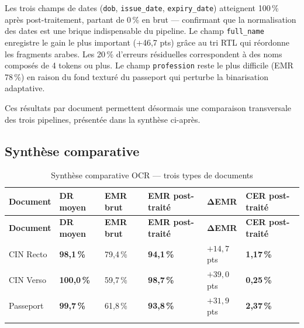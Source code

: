 \noindent Les trois champs de dates (\texttt{dob}, \texttt{issue\_date}, \texttt{expiry\_date}) atteignent 100\,\% après post-traitement, partant de 0\,\% en brut --- confirmant que la normalisation des dates est une brique indispensable du pipeline. Le champ \texttt{full\_name} enregistre le gain le plus important (+46,7 pts) grâce au tri RTL qui réordonne les fragments arabes. Les 20\,\% d'erreurs résiduelles correspondent à des noms composés de 4 tokens ou plus. Le champ \texttt{profession} reste le plus difficile (EMR 78\,\%) en raison du fond texturé du passeport qui perturbe la binarisation adaptative.

\medskip

Ces résultats par document permettent désormais une comparaison transversale des trois pipelines, présentée dans la synthèse ci-après.

\subsection{Synthèse comparative}
\label{subsec:synthese-ocr}

\renewcommand{\arraystretch}{1.35}
\begin{longtable}{|p{2.5cm}|p{2cm}|p{2cm}|p{2.8cm}|p{2cm}|p{2.8cm}|}
  \hline
  \rowcolor{bleu_principal!15}
  \textbf{Document} & \textbf{DR moyen} & \textbf{EMR brut} & \textbf{EMR post-traité} & $\boldsymbol{\Delta}$\textbf{EMR} & \textbf{CER post-traité} \\
  \hline
  \endfirsthead
  \hline
  \rowcolor{bleu_principal!15}
  \textbf{Document} & \textbf{DR moyen} & \textbf{EMR brut} & \textbf{EMR post-traité} & $\boldsymbol{\Delta}$\textbf{EMR} & \textbf{CER post-traité} \\
  \hline
  \endhead
  CIN Recto  & \textbf{98,1\,\%}  & 79,4\,\% & \textbf{94,1\,\%}  & $+14{,}7$ pts & \textbf{1,17\,\%} \\
  \hline
  CIN Verso  & \textbf{100,0\,\%} & 59,7\,\% & \textbf{98,7\,\%}  & $+39{,}0$ pts & \textbf{0,25\,\%} \\
  \hline
  Passeport  & \textbf{99,7\,\%}  & 61,8\,\% & \textbf{93,8\,\%}  & $+31{,}9$ pts & \textbf{2,37\,\%} \\
  \hline
  \caption{Synthèse comparative OCR --- trois types de documents}
  \label{tab:ocr-synthese}
\end{longtable}

